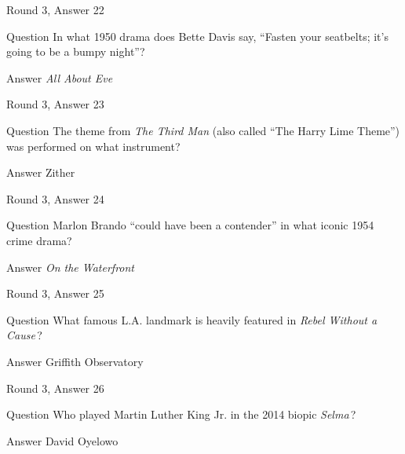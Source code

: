 \documentclass[11pt]{beamer}
\begin{document}
\begin{frame}[t]{Round 3, Answer 22}
\vspace{2em}
\begin{block}{Question}
In what 1950 drama does Bette Davis say, ``Fasten your seatbelts; it's going to be a bumpy night''?
\end{block}
\pause{}
\begin{block}{Answer}
\emph{All About Eve}
\end{block}
\end{frame}
    

\begin{frame}[t]{Round 3, Answer 23}
\vspace{2em}
\begin{block}{Question}
The theme from \emph{The Third Man} (also called ``The Harry Lime Theme'') was performed on what instrument?
\end{block}
\pause{}
\begin{block}{Answer}
Zither
\end{block}
\end{frame}
    

\begin{frame}[t]{Round 3, Answer 24}
\vspace{2em}
\begin{block}{Question}
Marlon Brando ``could have been a contender'' in what iconic 1954 crime drama?
\end{block}
\pause{}
\begin{block}{Answer}
\emph{On the Waterfront}
\end{block}
\end{frame}
    

\begin{frame}[t]{Round 3, Answer 25}
\vspace{2em}
\begin{block}{Question}
What famous L.A. landmark is heavily featured in \emph{Rebel Without a Cause}\,?
\end{block}
\pause{}
\begin{block}{Answer}
Griffith Observatory
\end{block}
\end{frame}
    

\begin{frame}[t]{Round 3, Answer 26}
\vspace{2em}
\begin{block}{Question}
Who played Martin Luther King Jr. in the 2014 biopic \emph{Selma}\,?
\end{block}
\pause{}
\begin{block}{Answer}
David Oyelowo
\end{block}
\end{frame}
    
\end{document}
